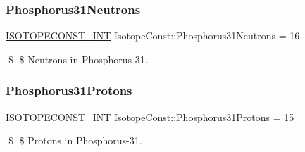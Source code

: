 \subsubsection{\texorpdfstring{Phosphorus31\+Neutrons}{Phosphorus31Neutrons}}
{\footnotesize\ttfamily \mbox{\hyperlink{group___isotope_const-_macros_ga5f18360b3e99483a35c32d789e62621c}{I\+S\+O\+T\+O\+P\+E\+C\+O\+N\+S\+T\+\_\+\+I\+NT}} Isotope\+Const\+::\+Phosphorus31\+Neutrons = 16}

\$ \$ Neutrons in Phosphorus-\/31. \mbox{\label{group___isotope_const-_phosphorus-_p31_ga4862a6d88e99a3d2a8075418c693ce5e}} 
\subsubsection{\texorpdfstring{Phosphorus31\+Protons}{Phosphorus31Protons}}
{\footnotesize\ttfamily \mbox{\hyperlink{group___isotope_const-_macros_ga5f18360b3e99483a35c32d789e62621c}{I\+S\+O\+T\+O\+P\+E\+C\+O\+N\+S\+T\+\_\+\+I\+NT}} Isotope\+Const\+::\+Phosphorus31\+Protons = 15}

\$ \$ Protons in Phosphorus-\/31. 